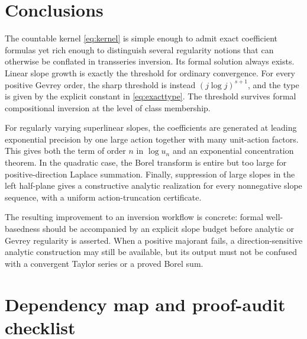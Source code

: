 \documentclass[11pt,a4paper]{article}
\numberwithin{equation}{section}
\theoremstyle{definition}
\theoremstyle{remark}
\begin{document}
\section{Conclusions}
\label{sec:conclusion}

The countable kernel \eqref{eq:kernel} is simple enough to admit exact
coefficient formulas yet rich enough to distinguish several regularity
notions that can otherwise be conflated in transseries inversion.
Its formal solution always exists.  Linear slope growth is exactly the
threshold for ordinary convergence.  For every positive Gevrey order,
the sharp threshold is instead $(j\log j)^{s+1}$, and the type is given
by the explicit constant in \eqref{eq:exacttype}.  The threshold survives
formal compositional inversion at the level of class membership.

For regularly varying superlinear slopes, the coefficients are generated
at leading exponential precision by one large action together with many
unit-action factors.  This gives both the term of order $n$ in
$\log u_n$ and an exponential concentration theorem.  In the quadratic
case, the Borel transform is entire but too large for positive-direction
Laplace summation.  Finally, suppression of large slopes in the left
half-plane gives a constructive analytic realization for every
nonnegative slope sequence, with a uniform action-truncation certificate.

The resulting improvement to an inversion workflow is concrete: formal
well-basedness should be accompanied by an explicit slope budget before
analytic or Gevrey regularity is asserted.  When a positive majorant fails,
a direction-sensitive analytic construction may still be available, but
its output must not be confused with a convergent Taylor series or a
proved Borel sum.

\appendix
\section{Dependency map and proof-audit checklist}
\label{app:audit}
\end{document}
